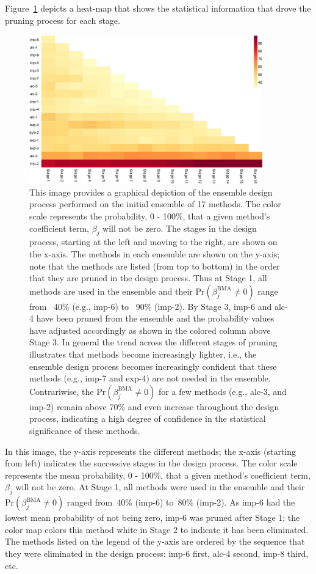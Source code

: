 \documentclass[journal=jpcbfk, manuscript=article]{achemso}
\newcommand{\+}[1]{\ensuremath{\mathbf{#1}}}
\newcommand{\rev}[1]{#1}
\begin{document}
Figure~\ref{Analysis:Figure3:P-not} depicts a heat-map that shows the statistical information that drove the pruning process for each stage.
\begin{figure}[h!]
	\centering
	\includegraphics[keepaspectratio,width=0.9\textwidth]{Figures/Rev2/P_Not_Zero_Per_Stage2}
	\caption{This image provides a graphical depiction of the ensemble design process performed on the initial ensemble of 17 methods.
	The color scale represents the probability, 0 - 100\%, that a given method's coefficient term, $\beta_j$ will not be zero.
	The stages in the design process, starting at the left and moving to the right, are shown on the x-axis.
	The methods in each ensemble are shown on the y-axis; note that the methods are listed (from top to bottom) in the order that they are pruned in the design process.
	Thus at Stage 1, all methods are used in the ensemble and their $\mathrm{Pr}(\beta_j^{\text{BMA}}\neq 0) $ range from ~40\% (e.g., imp-6) to ~90\% (imp-2).
	By Stage 3, imp-6 and alc-4 have been pruned from the ensemble and the probability values have adjusted accordingly as shown in the colored column above Stage 3.
	In general the trend across the different stages of pruning illustrates that methods become increasingly lighter, i.e., the ensemble design process becomes increasingly confident that these methods (e.g., imp-7 and exp-4) are not needed in the ensemble.
	\rev{Contrariwise, the $\mathrm{Pr}(\beta_j^{\text{BMA}}\neq 0) $ for a few methods (e.g., alc-3, and imp-2) remain above 70\% and even increase throughout the design process, indicating a high degree of confidence in the statistical significance of these methods.}}
	\label{Analysis:Figure3:P-not}
\end{figure}
In this image, the y-axis represents the different methods; the x-axis (starting from left) indicates the successive stages in the design process.
The color scale represents the mean probability, 0 - 100\%, that a given method's coefficient term, $\beta_j$ will not be zero.
At Stage 1, all methods were used in the ensemble and their $\mathrm{Pr}(\beta_j^{\text{BMA}}\neq 0)$ ranged from~40\% (imp-6) to~80\% (imp-2).
As imp-6 had the lowest mean probability of not being zero, imp-6 was pruned after Stage 1; the color map colors this method white in Stage 2 to indicate it has been eliminated.
The methods listed on the legend of the y-axis are  ordered by the sequence that they were eliminated in the design process: imp-6 first, alc-4 second, imp-8 third, etc.
\end{document}

